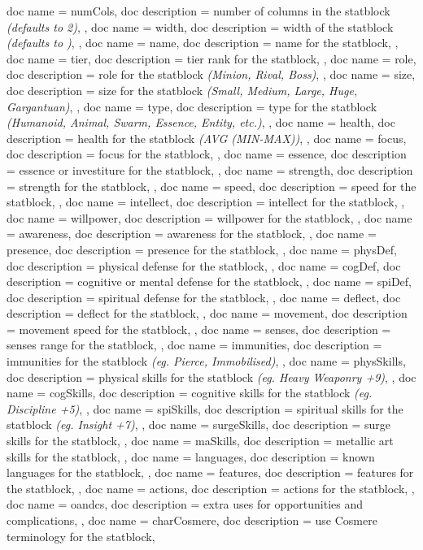 \documentclass[article,ariandor]{plotweaver}
\begin{document}
\begin{docKeys}[
  doc keypath = statblock,
  doc parameter = {=\meta{text}},
]{
{
  doc name = numCols,
  doc description = number of columns in the statblock \textit{(defaults to 2)},
},
{
  doc name = width,
  doc description = width of the statblock \textit{(defaults to )},
},
{
  doc name = name,
  doc description = name for the statblock,
},
{
  doc name = tier,
  doc description = tier rank for the statblock,
},
{
  doc name = role,
  doc description = {role for the statblock \textit{(Minion, Rival, Boss)}},
},
{
  doc name = size,
  doc description = {size for the statblock \textit{(Small, Medium, Large, Huge, Gargantuan)}},
},
{
  doc name = type,
  doc description = {type for the statblock \textit{(Humanoid, Animal, Swarm, Essence, Entity, etc.)}},
},
{
  doc name = health,
  doc description = {health for the statblock \textit{(AVG (MIN-MAX))}},
},
{
  doc name = focus,
  doc description = focus for the statblock,
},
{
  doc name = essence,
  doc description = essence or investiture for the statblock,
},
{
  doc name = strength,
  doc description = strength for the statblock,
},
{
  doc name = speed,
  doc description = speed for the statblock,
},
{
  doc name = intellect,
  doc description = intellect for the statblock,
},
{
  doc name = willpower,
  doc description = willpower for the statblock,
},
{
  doc name = awareness,
  doc description = awareness for the statblock,
},
{
  doc name = presence,
  doc description = presence for the statblock,
},
{
  doc name = physDef,
  doc description = physical defense for the statblock,
},
{
  doc name = cogDef,
  doc description = cognitive or mental defense for the statblock,
},
{
  doc name = spiDef,
  doc description = spiritual defense for the statblock,
},
{
  doc name = deflect,
  doc description = deflect for the statblock,
},
{
  doc name = movement,
  doc description = movement speed for the statblock,
},
{
  doc name = senses,
  doc description = senses range for the statblock,
},
{
  doc name = immunities,
  doc description = {immunities for the statblock \textit{(eg. Pierce, Immobilised)}},
},
{
  doc name = physSkills,
  doc description = {physical skills for the statblock \textit{(eg. Heavy Weaponry +9)}},
},
{
  doc name = cogSkills,
  doc description = {cognitive skills for the statblock \textit{(eg. Discipline +5)}},
},
{
  doc name = spiSkills,
  doc description = {spiritual skills for the statblock \textit{(eg. Insight +7)}},
},
{
  doc name = surgeSkills,
  doc description = surge skills for the statblock,
},
{
  doc name = maSkills,
  doc description = metallic art skills for the statblock,
},
{
  doc name = languages,
  doc description = known languages for the statblock,
},
{
  doc name = features,
  doc description = features for the statblock,
},
{
  doc name = actions,
  doc description = actions for the statblock,
},
{
  doc name = oandcs,
  doc description = extra uses for opportunities and complications,
},
{
  doc name = charCosmere,
  doc description = use Cosmere terminology for the statblock,
}
}
\end{docKeys}
\end{document}
